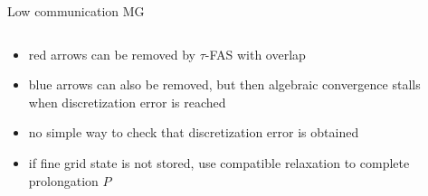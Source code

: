 \begin{frame}{Low communication MG}
  \begin{columns}
    \begin{column}{0.55\textwidth}
      \begin{itemize}
      \item {\color{red} red arrows} can be removed by $\tau$-FAS with overlap
      \item {\color{blue} blue arrows} can also be removed, but then
        algebraic convergence stalls when discretization error is
        reached
      \item no simple way to check that discretization error is obtained
      \item if fine grid state is not stored, use compatible relaxation to complete prolongation $P$
      \end{itemize}
    \end{column}
    \begin{column}{0.45\textwidth}
      \vspace{-2em}

\end{column}
\end{columns}
\end{frame}
